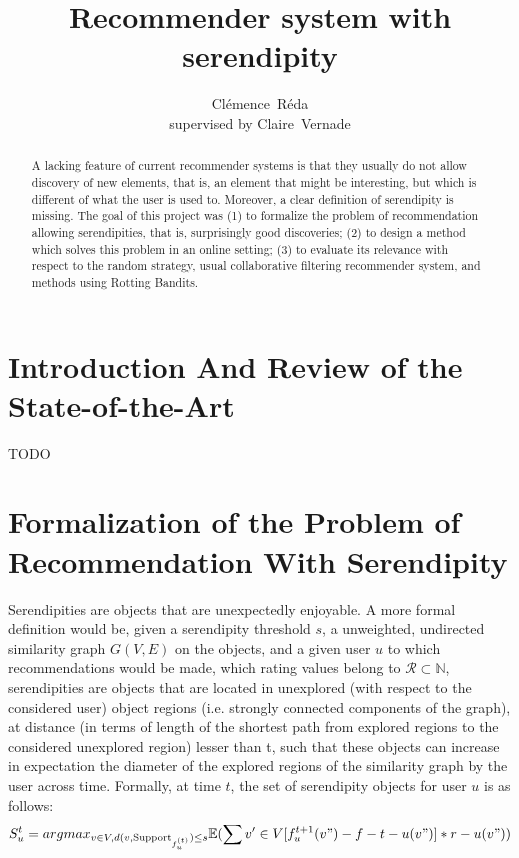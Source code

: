 \documentclass{article}
\title{Recommender system with serendipity}
\author{
  Cl\'{e}mence~R\'{e}da\\
  supervised by Claire~Vernade\\
}
\begin{document}
\nocite{*}

\maketitle

\begin{abstract}
A lacking feature of current recommender systems is that they usually do not allow discovery of new elements, that is, an element that might be interesting, but which is different of what the user is used to. Moreover, a clear definition of serendipity is missing. The goal of this project was (1) to formalize the problem of recommendation allowing serendipities, that is, surprisingly good discoveries; (2) to design a method which solves this problem in an online setting; (3) to evaluate its relevance with respect to the random strategy, usual collaborative filtering recommender system, and methods using Rotting Bandits.
\end{abstract}

\section{Introduction And Review of the State-of-the-Art}

TODO

\section{Formalization of the Problem of Recommendation With Serendipity}

Serendipities are objects that are unexpectedly enjoyable. A more formal definition would be, given a serendipity threshold $s$, a unweighted, undirected similarity graph $G(V, E)$ on the objects, and a given user $u$ to which recommendations would be made, which rating values belong to $\mathscr{R} \subset \mathbb{N}$, serendipities are objects that are located in unexplored (with respect to the considered user) object regions (i.e. strongly connected components of the graph), at distance (in terms of length of the shortest path from explored regions to the considered unexplored region) lesser than t, such that these objects can increase in expectation the diameter of the explored regions of the similarity graph by the user across time. Formally, at time $t$, the set of serendipity objects for user $u$ is as follows:\\

\begin{equation}
\begin{split}
S^{t}_{u} & = argmax_{v \in V, d(v, \text{Support}_{f^{(t)}_{u}}) \leq s} \mathbb{E}(\sum{v' \in V} [f^{t+1}_{u}(v")-f-{t}-u(v")]*r-u(v"))\\
\end{split}
\end{equation}
\end{document}
